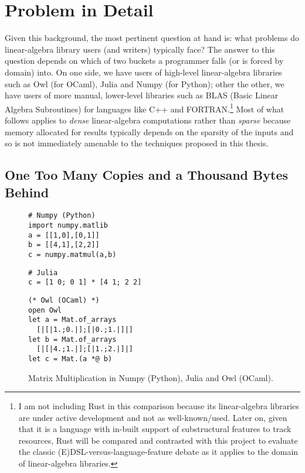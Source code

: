 \section{Problem in Detail}

Given this background, the most pertinent question at hand is: what problems do
linear-algebra library users (and writers) typically face? The answer to this
question depends on which of two buckets a programmer falls (or is forced by
domain) into. On one side, we have users of high-level linear-algebra libraries such
as Owl (for OCaml), Julia and Numpy (for Python); other the other, we have
users of more manual, lower-level libraries such as BLAS (Basic Linear Algebra
Subroutines) for languages like C++ and FORTRAN.\footnote{I am not including
Rust in this comparison because its linear-algebra libraries are under active
development and not as well-known/used. Later on, given that it is a language
with in-built support of substructural features to track resources, Rust will
be compared and contrasted with this project to evaluate the classic
(E)DSL-versus-language-feature debate as it applies to the domain of
linear-algebra libraries.} Most of what follows applies to \emph{dense}
linear-algebra computations rather than \emph{sparse} because memory
allocated for results typically depends on the sparsity of the inputs and
so is not immediately amenable to the techniques proposed in this thesis.

\subsection{One Too Many Copies and a Thousand Bytes Behind}
\begin{figure}[tbp]
    \centering
    \begin{minipage}{0.45\textwidth}
    \centering
    \begin{verbatim}
# Numpy (Python)
import numpy.matlib
a = [[1,0],[0,1]]
b = [[4,1],[2,2]]
c = numpy.matmul(a,b)
    \end{verbatim}
    \begin{verbatim}
# Julia
c = [1 0; 0 1] * [4 1; 2 2]
    \end{verbatim}
    \end{minipage}%
    \begin{minipage}{0.45\textwidth}
    \centering
    \begin{verbatim}
(* Owl (OCaml) *)
open Owl
let a = Mat.of_arrays
  [|[|1.;0.|];[|0.;1.|]|]
let b = Mat.of_arrays
  [|[|4.;1.|];[|1.;2.|]|]
let c = Mat.(a *@ b)
    \end{verbatim}
    \end{minipage}
    \caption{Matrix Multiplication in Numpy (Python), Julia and Owl (OCaml).}\label{fig:mat_mul_copies}
\end{figure}

